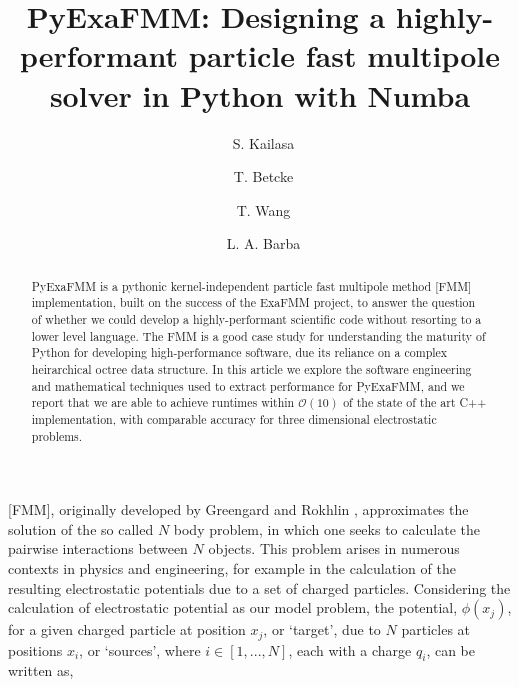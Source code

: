 \documentclass{IEEEcsmag}
\begin{document}

\title{PyExaFMM: Designing a highly-performant particle fast multipole solver in Python with Numba}

\author{\ S. Kailasa}

\author{\ T. Betcke}

\author{\ T. Wang}

\author{\ L. A. Barba}


\begin{abstract}
PyExaFMM is a pythonic kernel-independent particle fast multipole method [FMM] implementation, built on the success of the ExaFMM project, to answer the question of whether we could develop a highly-performant scientific code without resorting to a lower level language. The FMM is a good case study for understanding the maturity of Python for developing high-performance software, due its reliance on a complex heirarchical octree data structure. In this article we explore the software engineering and mathematical techniques used to extract performance for PyExaFMM, and we report that we are able to achieve runtimes within $\mathcal{O}(10)$ of the state of the art C++ implementation, with comparable accuracy for three dimensional electrostatic problems.

\end{abstract}

\maketitle

 [FMM], originally developed by Greengard and Rokhlin \cite{Greengard1987}, approximates the solution of the so called $N$ body problem, in which one seeks to calculate the pairwise interactions between $N$ objects. This problem arises in numerous contexts in physics and engineering, for example in the calculation of the resulting electrostatic potentials due to a set of charged particles. Considering the calculation of electrostatic potential as our model problem, the potential, $\phi(x_j)$, for a given charged particle at position $x_j$, or `target', due to $N$ particles at positions $x_i$, or `sources', where $i \in [1, ..., N]$, each with a charge $q_i$, can be written as,
\end{document}

